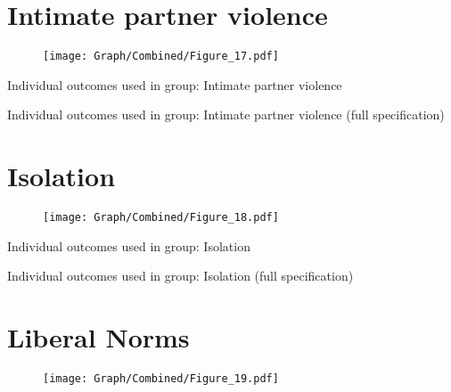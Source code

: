 \documentclass[10pt,a4paper]{article}
\begin{document}
\section{Intimate partner violence}
\begin{table}[H]\centering

\end{table}
\begin{figure}[H]\centering
\texttt{[image: Graph/Combined/Figure\_17.pdf]}
\caption{} \label{fig:Fig_17}
\end{figure}

\begin{table}[H]\centering\caption{Individual outcomes used in group: Intimate partner violence }
\resizebox{\textwidth}{!}{}
\end{table}
\begin{table}[H]\centering\caption{Individual outcomes used in group: Intimate partner violence (full specification)}
\resizebox{\textwidth}{!}{}
\end{table}
\pagebreak
\section{Isolation}
\begin{table}[H]\centering

\end{table}
\begin{figure}[H]\centering
\texttt{[image: Graph/Combined/Figure\_18.pdf]}
\caption{} \label{fig:Fig_18}
\end{figure}

\begin{table}[H]\centering\caption{Individual outcomes used in group: Isolation }
\resizebox{\textwidth}{!}{}
\end{table}
\begin{table}[H]\centering\caption{Individual outcomes used in group: Isolation (full specification)}
\resizebox{\textwidth}{!}{}
\end{table}
\pagebreak
\section{Liberal Norms}
\begin{table}[H]\centering

\end{table}
\begin{figure}[H]\centering
\texttt{[image: Graph/Combined/Figure\_19.pdf]}
\caption{} \label{fig:Fig_19}
\end{figure}
\end{document}
